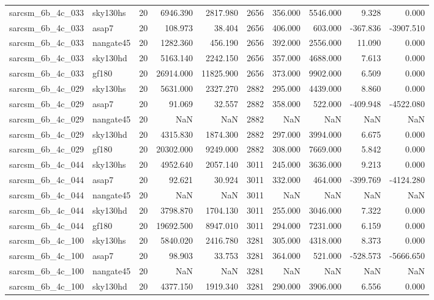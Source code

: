 \begin{longtable}{llrrrrrrrr}
sarcsm\_6b\_4c\_033 & sky130hs & 20 & 6946.390 & 2817.980 & 2656 & 356.000 & 5546.000 & 9.328 & 0.000 \\
sarcsm\_6b\_4c\_033 & asap7 & 20 & 108.973 & 38.404 & 2656 & 406.000 & 603.000 & -367.836 & -3907.510 \\
sarcsm\_6b\_4c\_033 & nangate45 & 20 & 1282.360 & 456.190 & 2656 & 392.000 & 2556.000 & 11.090 & 0.000 \\
sarcsm\_6b\_4c\_033 & sky130hd & 20 & 5163.140 & 2242.150 & 2656 & 357.000 & 4688.000 & 7.613 & 0.000 \\
sarcsm\_6b\_4c\_033 & gf180 & 20 & 26914.000 & 11825.900 & 2656 & 373.000 & 9902.000 & 6.509 & 0.000 \\
sarcsm\_6b\_4c\_029 & sky130hs & 20 & 5631.000 & 2327.270 & 2882 & 295.000 & 4439.000 & 8.860 & 0.000 \\
sarcsm\_6b\_4c\_029 & asap7 & 20 & 91.069 & 32.557 & 2882 & 358.000 & 522.000 & -409.948 & -4522.080 \\
sarcsm\_6b\_4c\_029 & nangate45 & 20 & NaN & NaN & 2882 & NaN & NaN & NaN & NaN \\
sarcsm\_6b\_4c\_029 & sky130hd & 20 & 4315.830 & 1874.300 & 2882 & 297.000 & 3994.000 & 6.675 & 0.000 \\
sarcsm\_6b\_4c\_029 & gf180 & 20 & 20302.000 & 9249.000 & 2882 & 308.000 & 7669.000 & 5.842 & 0.000 \\
sarcsm\_6b\_4c\_044 & sky130hs & 20 & 4952.640 & 2057.140 & 3011 & 245.000 & 3636.000 & 9.213 & 0.000 \\
sarcsm\_6b\_4c\_044 & asap7 & 20 & 92.621 & 30.924 & 3011 & 332.000 & 464.000 & -399.769 & -4124.280 \\
sarcsm\_6b\_4c\_044 & nangate45 & 20 & NaN & NaN & 3011 & NaN & NaN & NaN & NaN \\
sarcsm\_6b\_4c\_044 & sky130hd & 20 & 3798.870 & 1704.130 & 3011 & 255.000 & 3046.000 & 7.322 & 0.000 \\
sarcsm\_6b\_4c\_044 & gf180 & 20 & 19692.500 & 8947.010 & 3011 & 294.000 & 7231.000 & 6.159 & 0.000 \\
sarcsm\_6b\_4c\_100 & sky130hs & 20 & 5840.020 & 2416.780 & 3281 & 305.000 & 4318.000 & 8.373 & 0.000 \\
sarcsm\_6b\_4c\_100 & asap7 & 20 & 98.903 & 33.753 & 3281 & 364.000 & 521.000 & -528.573 & -5666.650 \\
sarcsm\_6b\_4c\_100 & nangate45 & 20 & NaN & NaN & 3281 & NaN & NaN & NaN & NaN \\
sarcsm\_6b\_4c\_100 & sky130hd & 20 & 4377.150 & 1919.340 & 3281 & 290.000 & 3906.000 & 6.556 & 0.000 \\

\end{longtable}
